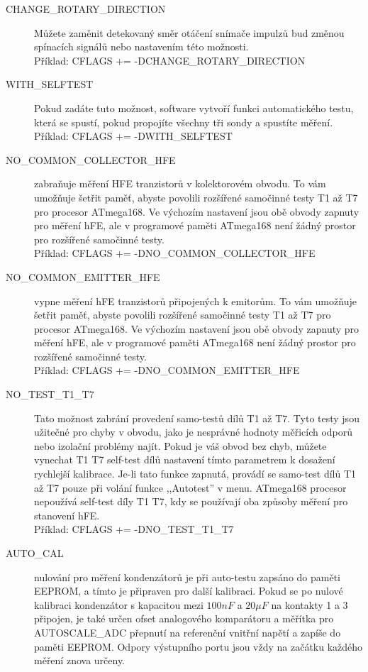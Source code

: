 \begin{description}
  \item[CHANGE\_ROTARY\_DIRECTION]  Můžete zaměnit detekovaný směr otáčení snímače impulzů bud 
změnou spínacích signálů nebo nastavením této možnosti.\\
Příklad: CFLAGS += -DCHANGE\_ROTARY\_DIRECTION
 \item[WITH\_SELFTEST]  Pokud zadáte tuto možnost, software vytvoří funkci automatického testu,
která se spustí, pokud propojíte všechny tři sondy a spustíte měření.\\
Příklad: CFLAGS += -DWITH\_SELFTEST
  \item[NO\_COMMON\_COLLECTOR\_HFE]  zabraňuje měření HFE tranzistorů v kolektorovém obvodu.
To vám umožňuje šetřit paměť, abyste povolili rozšířené samočinné testy T1 až T7 pro procesor ATmega168.
Ve výchozím nastavení jsou obě obvody zapnuty pro měření hFE,
ale v programové paměti ATmega168 není žádný prostor pro rozšířené samočinné testy.\\
Příklad: CFLAGS += -DNO\_COMMON\_COLLECTOR\_HFE
  \item[NO\_COMMON\_EMITTER\_HFE] vypne měření hFE tranzistorů připojených k emitorům.
To vám umožňuje šetřit paměť, abyste povolili rozšířené samočinné testy T1 až T7 pro procesor ATmega168.
Ve výchozím nastavení jsou obě obvody zapnuty pro měření hFE,
ale v programové paměti ATmega168 není žádný prostor pro rozšířené samočinné testy.\\
Příklad: CFLAGS += -DNO\_COMMON\_EMITTER\_HFE
  \item[NO\_TEST\_T1\_T7] Tato možnost zabrání provedení samo-testů dílů T1 až T7.
Tyto testy jsou užitečné pro chyby v obvodu, jako je nesprávné hodnoty měřicích odporů nebo
izolační problémy najít.
Pokud je váš obvod bez chyb, můžete vynechat T1 T7 self-test dílů nastavení tímto
parametrem k dosažení rychlejší kalibrace.
Je-li tato funkce zapnutá, provádí se samo-test dílů T1 až T7 pouze při volání funkce ,,Autotest'' v menu.
ATmega168 procesor nepoužívá self-test díly T1 T7, kdy se používají oba způsoby měření pro stanovení hFE.\\
Příklad: CFLAGS += -DNO\_TEST\_T1\_T7
  \item[AUTO\_CAL] nulování pro měření kondenzátorů je při auto-testu zapsáno do paměti EEPROM,
a tímto je připraven pro další kalibraci.
Pokud se po nulové kalibraci kondenzátor s kapacitou mezi \(100nF\) a \(20\mu F\)  na kontakty 1 a 3 
připojen, je také určen ofset analogového komparátoru a měřítka pro AUTOSCALE\_ADC přepnutí
na referenční vnitřní napětí a zapíše do paměti EEPROM.
Odpory výstupního portu jsou vždy na začátku každého měření znova určeny.\\

\end{description}
